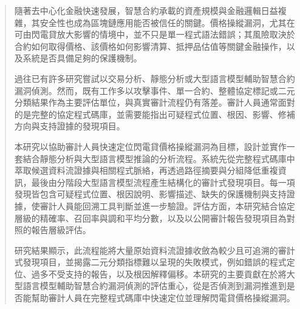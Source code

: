 
\begin{abstract}

隨著去中心化金融快速發展，智慧合約承載的資產規模與金融邏輯日益複雜，其安全性也成為區塊鏈應用能否被信任的關鍵。價格操縱漏洞，尤其在可由閃電貸放大影響的情境中，並不只是單一程式語法錯誤；其風險取決於合約如何取得價格、該價格如何影響清算、抵押品估值等關鍵金融操作，以及系統是否具備足夠的保護機制。

過往已有許多研究嘗試以交易分析、靜態分析或大型語言模型輔助智慧合約漏洞偵測。然而，既有工作多以攻擊事件、單一合約、整體協定標記或二元分類結果作為主要評估單位，與真實審計流程仍有落差。審計人員通常面對的是完整的協定程式碼庫，並需要能指出可疑程式位置、根因、影響、修補方向與支持證據的發現項目。

本研究以協助審計人員快速定位閃電貸價格操縱漏洞為目標，設計並實作一套結合靜態分析與大型語言模型推論的分析流程。系統先從完整程式碼庫中萃取候選資料流證據與相關程式脈絡，再透過路徑摘要與分組降低重複資訊，最後由分階段大型語言模型流程產生結構化的審計式發現項目。每一項發現皆包含可疑程式位置、根因說明、影響描述、缺失的保護機制與支持證據，使審計人員能回溯工具判斷並進一步驗證。評估方面，本研究結合協定層級的精確率、召回率與調和平均分數，以及以公開審計報告發現項目為對照的報告層級評估。

研究結果顯示，此流程能將大量原始資料流證據收斂為較少且可追溯的審計式發現項目，並揭露二元分類指標難以呈現的失敗模式，例如錯誤的程式定位、過多不受支持的報告，以及根因解釋偏移。本研究的主要貢獻在於將大型語言模型輔助智慧合約漏洞偵測的評估重心，從是否偵測到漏洞推進到是否能幫助審計人員在完整程式碼庫中快速定位並理解閃電貸價格操縱漏洞。

\end{abstract}

